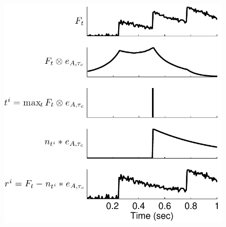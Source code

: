 \documentclass[12pt]{article}
\begin{document}
\begin{figure} \centering 
\includegraphics[height=0.8\textheight]{ppr_schem} 
\end{figure}


\newpage

%

\end{document}
